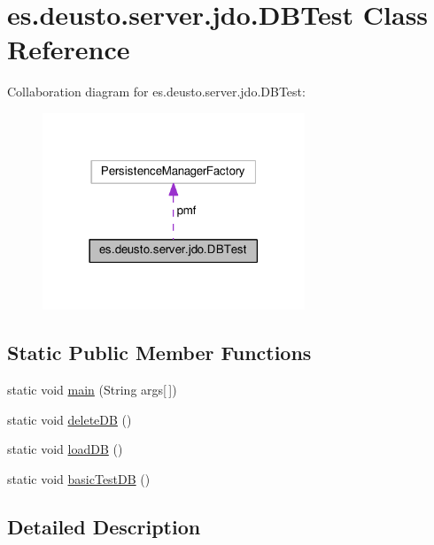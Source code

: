 \hypertarget{classes_1_1deusto_1_1server_1_1jdo_1_1_d_b_test}{}\section{es.\+deusto.\+server.\+jdo.\+D\+B\+Test Class Reference}
\label{classes_1_1deusto_1_1server_1_1jdo_1_1_d_b_test}


Collaboration diagram for es.\+deusto.\+server.\+jdo.\+D\+B\+Test\+:
\nopagebreak
\begin{figure}[H]
\begin{center}
\leavevmode
\includegraphics[width=222pt]{classes_1_1deusto_1_1server_1_1jdo_1_1_d_b_test__coll__graph}
\end{center}
\end{figure}
\subsection*{Static Public Member Functions}
\begin{DoxyCompactItemize}
\item 
static void \hyperlink{classes_1_1deusto_1_1server_1_1jdo_1_1_d_b_test_afd0180d9045ac006d8cbd145b9935c65}{main} (String args\mbox{[}$\,$\mbox{]})
\item 
static void \hyperlink{classes_1_1deusto_1_1server_1_1jdo_1_1_d_b_test_ae17f24746187cab1256b32c2b0ea1341}{delete\+DB} ()
\item 
static void \hyperlink{classes_1_1deusto_1_1server_1_1jdo_1_1_d_b_test_a8430b487bdfdf20d5f0e26517b7de1cc}{load\+DB} ()
\item 
static void \hyperlink{classes_1_1deusto_1_1server_1_1jdo_1_1_d_b_test_add160552e53376d7375c807043934688}{basic\+Test\+DB} ()
\end{DoxyCompactItemize}


\subsection{Detailed Description}


